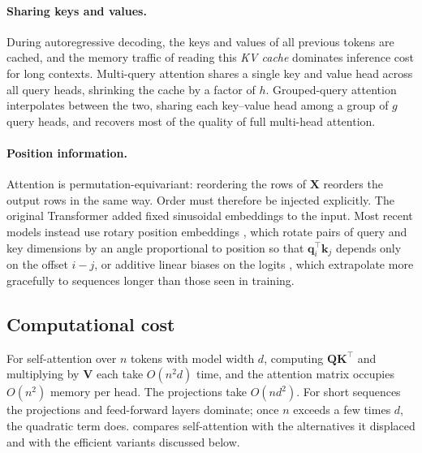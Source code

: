 \documentclass[11pt]{article}
\newcommand{\mQ}{\mathbf{Q}}
\newcommand{\mK}{\mathbf{K}}
\newcommand{\mV}{\mathbf{V}}
\newcommand{\mX}{\mathbf{X}}
\begin{document}
\paragraph{Sharing keys and values.} During autoregressive decoding, the keys and values of all previous tokens are cached, and the memory traffic of reading this \emph{KV cache} dominates inference cost for long contexts. Multi-query attention \citep{shazeer2019fast} shares a single key and value head across all query heads, shrinking the cache by a factor of $h$. Grouped-query attention \citep{ainslie2023gqa} interpolates between the two, sharing each key--value head among a group of $g$ query heads, and recovers most of the quality of full multi-head attention.

\paragraph{Position information.} Attention is permutation-equivariant: reordering the rows of $\mX$ reorders the output rows in the same way. Order must therefore be injected explicitly. The original Transformer added fixed sinusoidal embeddings to the input. Most recent models instead use rotary position embeddings \citep{su2024roformer}, which rotate pairs of query and key dimensions by an angle proportional to position so that $\bm{q}_i^\top\bm{k}_j$ depends only on the offset $i - j$, or additive linear biases on the logits \citep{press2022alibi}, which extrapolate more gracefully to sequences longer than those seen in training.

\subsection{Computational cost}
\label{sec:complexity}

For self-attention over $n$ tokens with model width $d$, computing $\mQ\mK^\top$ and multiplying by $\mV$ each take $O(n^2 d)$ time, and the attention matrix occupies $O(n^2)$ memory per head. The projections take $O(n d^2)$. For short sequences the projections and feed-forward layers dominate; once $n$ exceeds a few times $d$, the quadratic term does.  compares self-attention with the alternatives it displaced and with the efficient variants discussed below.
\end{document}
